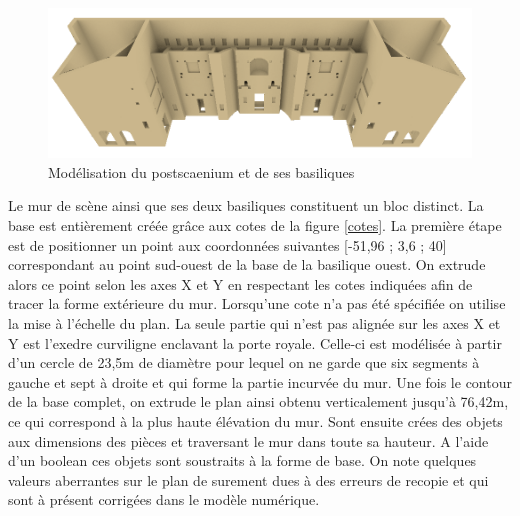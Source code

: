 \begin{figure}[!h]
	\includegraphics[width=\linewidth]{images/modMur2}
	\caption{Modélisation du \gls{postscaenium} et de ses \glspl{basilique}} 
	\label{modCavea} 
\end{figure} 

Le mur de scène ainsi que ses deux basiliques constituent un bloc distinct. La base est entièrement créée grâce aux cotes de la figure \ref{cotes}. La première étape est de positionner un point aux coordonnées suivantes [-51,96 ; 3,6 ; 40]  correspondant au point sud-ouest de la base de la basilique ouest. On extrude alors ce point selon les axes X et Y en respectant les cotes indiquées afin de tracer la forme extérieure du mur. Lorsqu'une cote n'a pas été spécifiée on utilise la mise à l'échelle du plan. La seule partie qui n'est pas alignée sur les axes X et Y est l'\gls{exedre} curviligne enclavant la porte royale. Celle-ci est modélisée à partir d'un cercle de 23,5m de diamètre pour lequel on ne garde que six segments à gauche et sept à droite et qui forme la partie incurvée du mur. Une fois le contour de la base complet, on extrude le plan ainsi obtenu verticalement jusqu'à 76,42m, ce qui correspond à la plus haute élévation du mur.
Sont ensuite crées des objets aux dimensions des pièces et traversant le mur dans toute sa hauteur. A l'aide d'un \gls{boolean} ces objets sont soustraits à la forme de base. On note quelques valeurs aberrantes sur le plan de \cite[Pl. XXI]{orangePl} surement dues à des erreurs de recopie et qui sont à présent corrigées dans le modèle numérique. 

